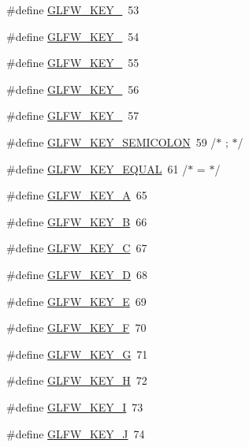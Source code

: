 \begin{DoxyCompactItemize}
\#define \hyperlink{group__keys_ga4d74ddaa5d4c609993b4d4a15736c924}{G\-L\-F\-W\-\_\-\-K\-E\-Y\-\_}~53
\item 
\#define \hyperlink{group__keys_ga9ea4ab80c313a227b14d0a7c6f810b5d}{G\-L\-F\-W\-\_\-\-K\-E\-Y\-\_}~54
\item 
\#define \hyperlink{group__keys_gab79b1cfae7bd630cfc4604c1f263c666}{G\-L\-F\-W\-\_\-\-K\-E\-Y\-\_}~55
\item 
\#define \hyperlink{group__keys_gadeaa109a0f9f5afc94fe4a108e686f6f}{G\-L\-F\-W\-\_\-\-K\-E\-Y\-\_}~56
\item 
\#define \hyperlink{group__keys_ga2924cb5349ebbf97c8987f3521c44f39}{G\-L\-F\-W\-\_\-\-K\-E\-Y\-\_}~57
\item 
\#define \hyperlink{group__keys_ga84233de9ee5bb3e8788a5aa07d80af7d}{G\-L\-F\-W\-\_\-\-K\-E\-Y\-\_\-\-S\-E\-M\-I\-C\-O\-L\-O\-N}~59  /$\ast$ ; $\ast$/
\item 
\#define \hyperlink{group__keys_gae1a2de47240d6664423c204bdd91bd17}{G\-L\-F\-W\-\_\-\-K\-E\-Y\-\_\-\-E\-Q\-U\-A\-L}~61  /$\ast$ = $\ast$/
\item 
\#define \hyperlink{group__keys_ga03e842608e1ea323370889d33b8f70ff}{G\-L\-F\-W\-\_\-\-K\-E\-Y\-\_\-\-A}~65
\item 
\#define \hyperlink{group__keys_ga8e3fb647ff3aca9e8dbf14fe66332941}{G\-L\-F\-W\-\_\-\-K\-E\-Y\-\_\-\-B}~66
\item 
\#define \hyperlink{group__keys_ga00ccf3475d9ee2e679480d540d554669}{G\-L\-F\-W\-\_\-\-K\-E\-Y\-\_\-\-C}~67
\item 
\#define \hyperlink{group__keys_ga011f7cdc9a654da984a2506479606933}{G\-L\-F\-W\-\_\-\-K\-E\-Y\-\_\-\-D}~68
\item 
\#define \hyperlink{group__keys_gabf48fcc3afbe69349df432b470c96ef2}{G\-L\-F\-W\-\_\-\-K\-E\-Y\-\_\-\-E}~69
\item 
\#define \hyperlink{group__keys_ga5df402e02aca08444240058fd9b42a55}{G\-L\-F\-W\-\_\-\-K\-E\-Y\-\_\-\-F}~70
\item 
\#define \hyperlink{group__keys_gae74ecddf7cc96104ab23989b1cdab536}{G\-L\-F\-W\-\_\-\-K\-E\-Y\-\_\-\-G}~71
\item 
\#define \hyperlink{group__keys_gad4cc98fc8f35f015d9e2fb94bf136076}{G\-L\-F\-W\-\_\-\-K\-E\-Y\-\_\-\-H}~72
\item 
\#define \hyperlink{group__keys_ga274655c8bfe39742684ca393cf8ed093}{G\-L\-F\-W\-\_\-\-K\-E\-Y\-\_\-\-I}~73
\item 
\#define \hyperlink{group__keys_ga65ff2aedb129a3149ad9cb3e4159a75f}{G\-L\-F\-W\-\_\-\-K\-E\-Y\-\_\-\-J}~74

\end{DoxyCompactItemize}
